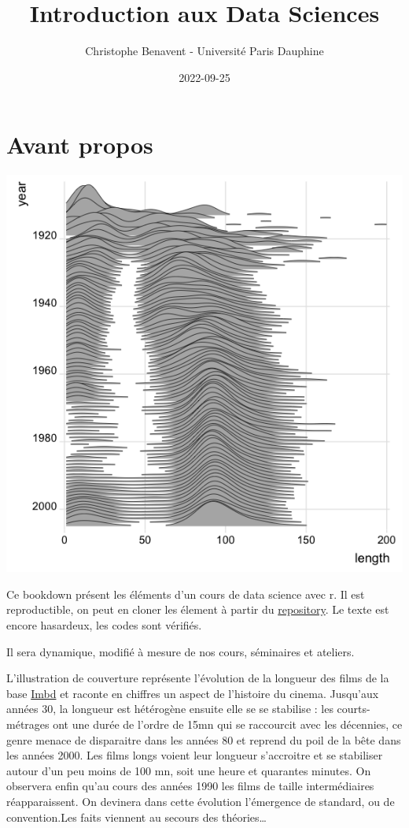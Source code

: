 \documentclass[
]{book}
\title{Introduction aux Data Sciences}
\author{Christophe Benavent - Université Paris Dauphine}
\date{2022-09-25}
\begin{document}
\maketitle

{
\setcounter{tocdepth}{1}
\tableofcontents
}
\hypertarget{avant-propos}{%
\chapter{Avant propos}\label{avant-propos}}

\includegraphics{./Images/ggridge.png}

Ce bookdown présent les éléments d'un cours de data science avec r. Il est reproductible, on peut en cloner les élement à partir du \href{https://github.com/BenaventC/DataScienceBook}{repository}. Le texte est encore hasardeux, les codes sont vérifiés.

Il sera dynamique, modifié à mesure de nos cours, séminaires et ateliers.

L'illustration de couverture représente l'évolution de la longueur des films de la base \href{https://www.imdb.com/}{Imbd} et raconte en chiffres un aspect de l'histoire du cinema. Jusqu'aux années 30, la longueur est hétérogène ensuite elle se se stabilise : les courts-métrages ont une durée de l'ordre de 15mn qui se raccourcit avec les décennies, ce genre menace de disparaitre dans les années 80 et reprend du poil de la bête dans les années 2000. Les films longs voient leur longueur s'accroitre et se stabiliser autour d'un peu moins de 100 mn, soit une heure et quarantes minutes. On observera enfin qu'au cours des années 1990 les films de taille intermédiaires réapparaissent. On devinera dans cette évolution l'émergence de standard, ou de convention.Les faits viennent au secours des théories\ldots{}
\end{document}
